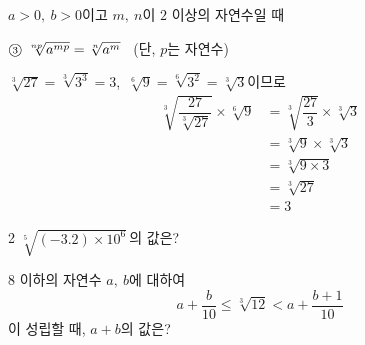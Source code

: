 \documentclass[10pt]{article}
\begin{document}
\dmssdotline{95mm}

\begin{dmssguide}
$a>0,\ b>0$이고 $m,\ n$이 $2$ 이상의 자연수일 때
\par\vspace{1mm}
\noindent{}%
\par
$\text{\textcircled{\scriptsize 3}}\ \sqrt[np]{a^{mp}} = \sqrt[n]{a^m}$ \ (단, $p$는 자연수)
\end{dmssguide}

\begin{dmsssolve}
$\sqrt[3]{27} = \sqrt[3]{3^3} = 3$,\ $\sqrt[6]{9} = \sqrt[6]{3^2} = \sqrt[3]{3}$이므로
\begin{align*}
\sqrt[3]{\dfrac{27}{\sqrt[3]{27}}} \times \sqrt[6]{9}
&= \sqrt[3]{\dfrac{27}{3}} \times \sqrt[3]{3}\\
&= \sqrt[3]{9} \times \sqrt[3]{3}\\
&= \sqrt[3]{9 \times 3}\\
&= \sqrt[3]{27}\\
&= 3
\end{align*}
\end{dmsssolve}

\begin{dmssyujaebox}{2}
%
$\sqrt[5]{(-3.2) \times 10^{6}}$\,의 값은?
\par\vspace{1mm}
\hspace*{20mm}%
%
%
%

\vspace{9mm}

%
$8$ 이하의 자연수 $a,\ b$에 대하여
\begin{equation*}
a + \dfrac{b}{10} \le \sqrt[3]{12} < a + \dfrac{b+1}{10}
\end{equation*}
이 성립할 때, $a+b$의 값은?
\par\vspace{1mm}
\hspace*{20mm}%
%
%
%
\vspace{22mm}    %
\end{dmssyujaebox}
\end{document}

